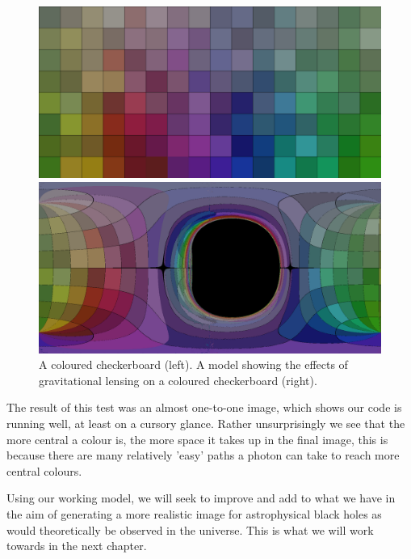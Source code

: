 \documentclass[oneside,openright,frontopenright, singlespacing]{dmathesis}
\begin{document}
\vspace{1em}
\begin{figure}[!ht]
	\centering
	\begin{minipage}{0.5\textwidth}
		\centering
		\includegraphics[width=0.95\linewidth]{img/checkerboard-own}
	\end{minipage}%
	\hfill
	\begin{minipage}{0.5\textwidth}
		\centering
		\includegraphics[width=0.95\linewidth]{img/checkerboard-own-kerr}
	\end{minipage}
	\caption{A coloured checkerboard (left). A model showing the effects of gravitational lensing on a coloured checkerboard (right).}
	\label{fig:Figure4.6}
\end{figure}

\vspace{1em}
	The result of this test was an almost one-to-one image, which shows our code is running well, at least on a cursory glance. Rather unsurprisingly we see that the more central a colour is, the more space it takes up in the final image, this is because there are many relatively 'easy' paths a photon can take to reach more central colours.

\vspace{1em}
	Using our working model, we will seek to improve and add to what we have in the aim of generating a more realistic image for astrophysical black holes as would theoretically be observed in the universe. This is what we will work towards in the next chapter.
\end{document}
